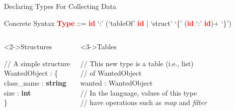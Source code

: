 \documentclass[10pt,xcolor={dvipsnames}]{beamer}
\begin{document}
	\begin{frame}{Declaring Types For Collecting Data}
		\begin{block}{Concrete Syntax}
			\hspace{1cm} \textcolor{red}{\textbf{Type}} ::= \textcolor{red}{\textbf{id}} `\textcolor{Emerald}{:}' (`\textcolor{Emerald}{tableOf}' \textcolor{red}{\textbf{id}} $|$ `\textcolor{Emerald}{struct}' `\textcolor{Emerald}{\{}' (\textcolor{red}{\textbf{id}} `\textcolor{Emerald}{:}' \textcolor{red}{\textbf{id}})$+$  `\textcolor{Emerald}{\}}') 
		\end{block}
		\begin{columns}
			\begin{exampleblock}<2->{Structures}
				\begin{footnotesize}
					\hspace{.3cm} \textcolor{Emerald}{// A simple structure} \\
					\hspace{.3cm} WantedObject :  \{ \\
					\hspace{.6cm} class\_name : \textbf{string} \\
					\hspace{.6cm} size : \textbf{int} \\
					\hspace{.3cm} \} \\
				\end{footnotesize}
			\end{exampleblock}
			\column{0.48\textwidth}
			\begin{exampleblock}<3->{Tables}
				\begin{footnotesize}
					\hspace{.3cm} \textcolor{Emerald}{// This new type is a table (i.e., list)} \\
					\hspace{.3cm} \textcolor{Emerald}{// of WantedObject} \\
					\hspace{.3cm} wanted :  WantedObject \\
					\hspace{.3cm} \textcolor{Emerald}{// In the language, values of this type} \\
					\hspace{.3cm} \textcolor{Emerald}{// have operations such as \textit{map} and \textit{filter}} \\
				\end{footnotesize}

\end{exampleblock}
\end{columns}
\end{frame}
\end{document}
